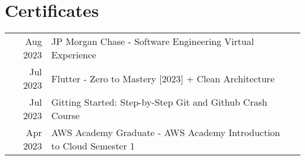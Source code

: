 \documentclass[]{resume}
\begin{document}
\begin{minipage}[t]{0.66\textwidth}

    \section{Certificates} 
    \begin{tabular}{rll}
    Aug 2023 & JP Morgan Chase - Software Engineering Virtual Experience\\
    Jul 2023 & Flutter - Zero to Mastery [2023] + Clean Architecture \\
    Jul 2023 & Gitting Started: Step-by-Step Git and Github Crash Course \\
    Apr 2023 & AWS Academy Graduate - AWS Academy Introduction to Cloud Semester 1

    \end{tabular}
    \sectionsep

\end{minipage}
\end{document}
